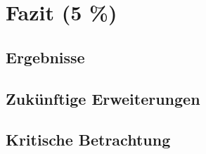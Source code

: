 \chapter{Fazit (5 \%)}
\section{Ergebnisse}
\section{Zukünftige Erweiterungen}
\section{Kritische Betrachtung}
